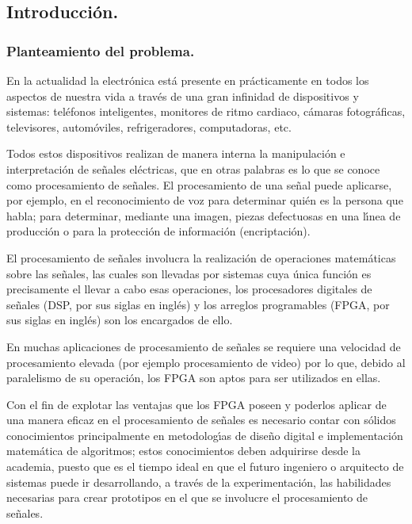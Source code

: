 \begin{doublespace}

\part{Introducci\'{o}n.}
\end{doublespace}
\begin{doublespace}

\section{Planteamiento del problema.}
\end{doublespace}

En la actualidad la electr\'{o}nica est\'{a} presente en pr\'{a}cticamente
en todos los aspectos de nuestra vida a trav\'{e}s de una gran infinidad
de dispositivos y sistemas: tel\'{e}fonos inteligentes, monitores
de ritmo cardiaco, c\'{a}maras fotogr\'{a}ficas, televisores, autom\'{o}viles,
refrigeradores, computadoras, etc. 

Todos estos dispositivos realizan de manera interna la manipulaci\'{o}n
e interpretaci\'{o}n de se\~{n}ales el\'{e}ctricas, que en otras palabras
es lo que se conoce como procesamiento de se\~{n}ales. El procesamiento
de una se\~{n}al puede aplicarse, por ejemplo, en el reconocimiento
de voz para determinar qui\'{e}n es la persona que habla; para determinar,
mediante una imagen, piezas defectuosas en una l\'{\i}nea de producci\'{o}n
o para la protecci\'{o}n de informaci\'{o}n (encriptaci\'{o}n). 

El procesamiento de se\~{n}ales involucra la realizaci\'{o}n de operaciones
matem\'{a}ticas sobre las se\~{n}ales, las cuales son llevadas por
sistemas cuya \'{u}nica funci\'{o}n es precisamente el llevar a cabo
esas operaciones, los procesadores digitales de se\~{n}ales (DSP,
por sus siglas en ingl\'{e}s) y los arreglos programables (FPGA, por
sus siglas en ingl\'{e}s) son los encargados de ello. 

En muchas aplicaciones de procesamiento de se\~{n}ales se requiere
una velocidad de procesamiento elevada (por ejemplo procesamiento
de video) por lo que, debido al paralelismo de su operaci\'{o}n, los
FPGA son aptos para ser utilizados en ellas\cite{kehtarnavaz_digital_2010}. 

Con el fin de explotar las ventajas que los FPGA poseen y poderlos
aplicar de una manera eficaz en el procesamiento de se\~{n}ales es
necesario contar con s\'{o}lidos conocimientos principalmente en metodolog\'{\i}as
de dise\~{n}o digital e implementaci\'{o}n matem\'{a}tica de algoritmos;
estos conocimientos deben adquirirse desde la academia, puesto que
es el tiempo ideal en que el futuro ingeniero o arquitecto de sistemas
puede ir desarrollando, a trav\'{e}s de la experimentaci\'{o}n, las
habilidades necesarias para crear prototipos en el que se involucre
el procesamiento de se\~{n}ales. 

